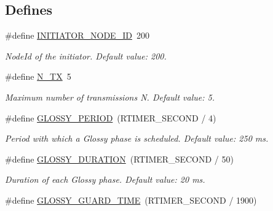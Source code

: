 \subsection*{Defines}
\begin{DoxyCompactItemize}
\item 
\hypertarget{group__glossy-test-settings_ga2e373237aef3ee2b0fdb15cd0b8c5390}{
\#define \hyperlink{group__glossy-test-settings_ga2e373237aef3ee2b0fdb15cd0b8c5390}{INITIATOR\_\-NODE\_\-ID}~200}
\label{group__glossy-test-settings_ga2e373237aef3ee2b0fdb15cd0b8c5390}

\begin{DoxyCompactList}\small\item\em NodeId of the initiator. Default value: 200. \end{DoxyCompactList}\item 
\hypertarget{group__glossy-test-settings_ga50f8fba62aef680d9929caefea7ca7e4}{
\#define \hyperlink{group__glossy-test-settings_ga50f8fba62aef680d9929caefea7ca7e4}{N\_\-TX}~5}
\label{group__glossy-test-settings_ga50f8fba62aef680d9929caefea7ca7e4}

\begin{DoxyCompactList}\small\item\em Maximum number of transmissions N. Default value: 5. \end{DoxyCompactList}\item 
\hypertarget{group__glossy-test-settings_ga6f68058577fdbfccbd8e50537609a5e4}{
\#define \hyperlink{group__glossy-test-settings_ga6f68058577fdbfccbd8e50537609a5e4}{GLOSSY\_\-PERIOD}~(RTIMER\_\-SECOND / 4)}
\label{group__glossy-test-settings_ga6f68058577fdbfccbd8e50537609a5e4}

\begin{DoxyCompactList}\small\item\em Period with which a Glossy phase is scheduled. Default value: 250 ms. \end{DoxyCompactList}\item 
\hypertarget{group__glossy-test-settings_ga26e366aad612a866fe38ef7bd7629858}{
\#define \hyperlink{group__glossy-test-settings_ga26e366aad612a866fe38ef7bd7629858}{GLOSSY\_\-DURATION}~(RTIMER\_\-SECOND / 50)}
\label{group__glossy-test-settings_ga26e366aad612a866fe38ef7bd7629858}

\begin{DoxyCompactList}\small\item\em Duration of each Glossy phase. Default value: 20 ms. \end{DoxyCompactList}\item 
\hypertarget{group__glossy-test-settings_gaf0ee14116d6799a20e4e415a5990e77c}{
\#define \hyperlink{group__glossy-test-settings_gaf0ee14116d6799a20e4e415a5990e77c}{GLOSSY\_\-GUARD\_\-TIME}~(RTIMER\_\-SECOND / 1900)}
\label{group__glossy-test-settings_gaf0ee14116d6799a20e4e415a5990e77c}


\end{DoxyCompactItemize}
